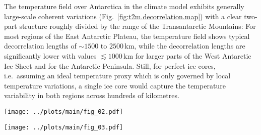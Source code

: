 \documentclass[cp, manuscript]{copernicus}
\begin{document}
The temperature field over Antarctica in the climate model exhibits generally
large-scale coherent variations (Fig.~\ref{fig:t2m.decorrelation.map}) with a
clear two-part structure roughly divided by the range of the Transantarctic
Mountains: For most regions of the East Antarctic Plateau, the temperature field
shows typical decorrelation lengths of $\sim1500$ to $2500$\,km, while the
decorrelation lengths are significantly lower with values $\lesssim1000$\,km for
larger parts of the West Antarctic Ice Sheet and for the Antarctic Peninsula.
Still, for perfect ice cores, i.e.\ assuming an ideal temperature proxy which is
only governed by local temperature variations, a single ice core would capture
the temperature variability in both regions across hundreds of kilometres.

\begin{figure*}[t]%
\centering
\texttt{[image: ../plots/main/fig\_02.pdf]}
\caption{%
  Temperature decorrelation lengths across Antarctica. The temperature
  decorrelation lengths ($\tau$, in km) for each Antarctic model grid cell are
  estimated by fitting an exponential model to the correlation--distance
  relationship (cf. Eq.~\ref{eq:t2m.decorr}) obtained from correlating the local
  annual near-surface $T_{2\mathrm{m}}$ time series with the respective
  temperature time series from all other grid cells. Note that only continental
  grid cells are used for the fit.}
\label{fig:t2m.decorrelation.map}%
\end{figure*}%

\begin{figure*}[t]%
\centering
\texttt{[image: ../plots/main/fig\_03.pdf]}
\caption{%
  The local temperature--isotope relationship across Antarctica. Shown are the
  local correlations for each model grid cell between the annual time series of
  (\textbf{a}) near-surface temperature ($T_{2\mathrm{m}}$) and
  precipitation-weighted oxygen isotope composition
  ($\delta^{18}\mathrm{O}^{\mathrm{(pw)}}$) and (\textbf{b})
  precipitation-weighted near-surface temperature
  $T_{2\mathrm{m}}^{\mathrm{(pw)}}$ and
  $\delta^{18}\mathrm{O}^{\mathrm{(pw)}}$.}
\label{fig:t2m.oxy.correlation.maps}%
\end{figure*}%
\end{document}
